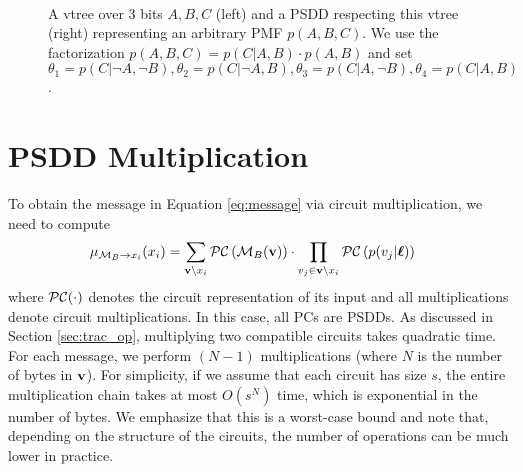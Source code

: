 \begin{figure*}[ht!]
    \begin{subfigure}[t]{0.2\textwidth}
        \vspace{-4.0cm}
        \centering
        
    \end{subfigure}
    ~
    \begin{subfigure}[t]{0.8\textwidth}
        
    \end{subfigure}
    \caption{A vtree over 3 bits $A,B,C$ (left) and a PSDD respecting this vtree (right) representing an arbitrary PMF $p(A,B,C)$. We use the factorization $p(A,B,C) = p(C | A,B) \cdot p(A,B)$ and set $\theta_1 = p(C | \neg A, \neg B), \theta_2 = p(C | \neg A, B), \theta_3 = p(C | A, \neg B), \theta_4 = p(C | A, B)$.}
    \label{fig:pmf_comp}
\end{figure*}


\section{PSDD Multiplication}
To obtain the message in Equation \ref{eq:message} via circuit multiplication, we need to compute
\begin{align}
\label{eq:pc_message}
    \mu_{\mathcal{M}_B \to x_i}(x_i) &= \sum_{\mathbf{v} \setminus x_i} \mathcal{PC} \left( \mathcal{M}_B(\mathbf{v}) \right) \cdot \prod_{v_j \in \mathbf{v} \setminus x_i} \mathcal{PC}\left( p(v_j | \boldsymbol{\ell}) \right)
\end{align}
where $\mathcal{PC}(\cdot)$ denotes the circuit representation of its input and all multiplications denote circuit multiplications. In this case, all PCs are PSDDs.
As discussed in Section \ref{sec:trac_op}, multiplying two compatible circuits takes quadratic time. 
For each message, we perform $(N-1)$ multiplications (where $N$ is the number of bytes in $\mathbf{v}$). For simplicity, if we assume that each circuit has size $s$, the entire multiplication chain takes at most $O(s^N)$ time, which is exponential in the number of bytes. We emphasize that this is a worst-case bound and note that, depending on the structure of the circuits, the number of operations can be much lower in practice.

